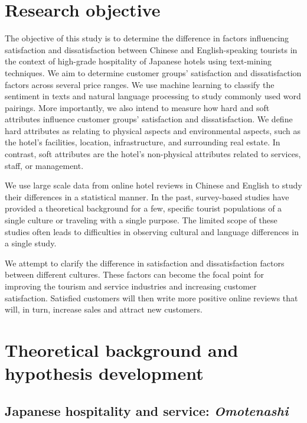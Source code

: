 \documentclass[smallextended,natbib]{svjour3}       %
\begin{document}
\section{Research objective}\label{research_objective}

  The objective of this study is to determine the difference in factors influencing satisfaction and dissatisfaction between Chinese and English-speaking tourists in the context of high-grade hospitality of Japanese hotels using text-mining techniques. We aim to determine customer groups' satisfaction and dissatisfaction factors across several price ranges. We use machine learning to classify the sentiment in texts and natural language processing to study commonly used word pairings. More importantly, we also intend to measure how hard and soft attributes influence customer groups' satisfaction and dissatisfaction. We define hard attributes as relating to physical aspects and environmental aspects, such as the hotel's facilities, location, infrastructure, and surrounding real estate. In contrast, soft attributes are the hotel's non-physical attributes related to services, staff, or management.

  We use large scale data from online hotel reviews in Chinese and English to study their differences in a statistical manner. In the past, survey-based studies have provided a theoretical background for a few, specific tourist populations of a single culture or traveling with a single purpose. The limited scope of these studies often leads to difficulties in observing cultural and language differences in a single study.

  We attempt to clarify the difference in satisfaction and dissatisfaction factors between different cultures. These factors can become the focal point for improving the tourism and service industries and increasing customer satisfaction. Satisfied customers will then write more positive online reviews that will, in turn, increase sales and attract new customers.

\section{Theoretical background and hypothesis development}\label{theory_hypothesis}

  \subsection{Japanese hospitality and service: \textit{Omotenashi}}\label{theory_omotenashi}
\end{document}
